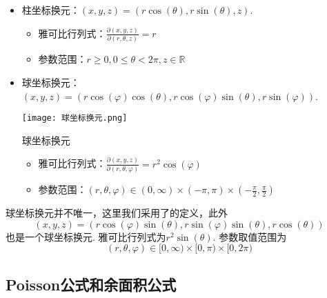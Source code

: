 \begin{itemize}
    \item 柱坐标换元：$(x,y,z)=(r\cos(\theta),r\sin(\theta),z)$. 
        \begin{itemize}
            \item 雅可比行列式：$\frac{\partial(x,y,z)}{\partial(r,\theta,z)}=r$
            \item 参数范围：$r\geq 0,0\leq\theta<2\pi,z\in\mathbb{R}$
        \end{itemize}
    \item 球坐标换元：$(x,y,z)=(r\cos(\varphi)\cos(\theta),r\cos(\varphi)\sin(\theta),r\sin(\varphi))$.
    \begin{marginfigure}
        \centering
        \texttt{[image: 球坐标换元.png]}
        \caption{球坐标换元}
        \label{fig:球坐标换元}
    \end{marginfigure}
        \begin{itemize}
            \item 雅可比行列式：$\frac{\partial(x,y,z)}{\partial(r,\theta,\varphi)}=r^2\cos(\varphi)$
            \item 参数范围：$(r,\theta,\varphi)\in(0,\infty)\times (-\pi,\pi)\times (-\frac{\pi}{2},\frac{\pi}{2})$
        \end{itemize}
\end{itemize}

\begin{kaobox}[frametitle=球坐标换元的说明]
    球坐标换元并不唯一，这里我们采用了的定义，此外
    \[
        (x,y,z)=(r\cos(\varphi)\sin(\theta),r\sin(\varphi)\sin(\theta),r\cos(\theta))
    \]
    也是一个球坐标换元. 雅可比行列式为$r^2\sin(\theta)$. 参数取值范围为
    \[
        (r,\theta,\varphi)\in[0,\infty)\times[0,\pi)\times[0,2\pi)
    \]
\end{kaobox}

\subsection{Poisson公式和余面积公式}

